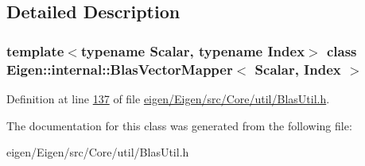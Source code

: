 \subsection{Detailed Description}
\subsubsection*{template$<$typename Scalar, typename Index$>$\newline
class Eigen\+::internal\+::\+Blas\+Vector\+Mapper$<$ Scalar, Index $>$}



Definition at line \hyperlink{eigen_2_eigen_2src_2_core_2util_2_blas_util_8h_source_l00137}{137} of file \hyperlink{eigen_2_eigen_2src_2_core_2util_2_blas_util_8h_source}{eigen/\+Eigen/src/\+Core/util/\+Blas\+Util.\+h}.



The documentation for this class was generated from the following file\+:\begin{DoxyCompactItemize}
\item 
eigen/\+Eigen/src/\+Core/util/\+Blas\+Util.\+h\end{DoxyCompactItemize}
